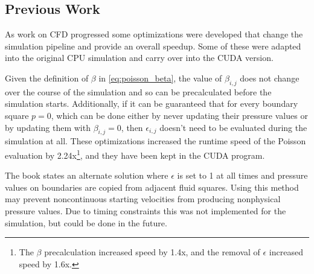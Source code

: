\subsection{Previous Work}
\label{research:prev_work}
As work on CFD progressed some optimizations were developed that change the simulation pipeline and provide an overall speedup.
Some of these were adapted into the original CPU simulation\cite{modules:aca257submission} and carry over into the CUDA version.


Given the definition of $\beta$ in \cref{eq:poisson_beta}, the value of $\beta_{i,j}$ does not change over the course of the simulation and so can be precalculated before the simulation starts.
Additionally, if it can be guaranteed that for every boundary square $p = 0$, which can be done either by never updating their pressure values or by updating them with $\beta_{i,j} = 0$, then $\epsilon_{i,j}$ doesn't need to be evaluated during the simulation at all.
These optimizations increased the runtime speed of the Poisson evaluation by 2.24x\footnote{The $\beta$ precalculation increased speed by 1.4x, and the removal of $\epsilon$ increased speed by 1.6x.\cite{modules:aca257submission}}, and they have been kept in the CUDA program.

The book states an alternate solution where $\epsilon$ is set to 1 at all times and pressure values on boundaries are copied from adjacent fluid squares\cite{book:griebel1998numerical}.
Using this method may prevent noncontinuous starting velocities from producing nonphysical pressure values.
Due to timing constraints this was not implemented for the simulation, but could be done in the future.
\label{ext:PressureValues}


